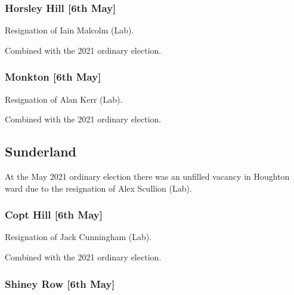 \documentclass[a4paper,openany]{book}
\begin{document}
\begin{resultsiii}
\subsubsection*{Horsley Hill \hspace*{\fill}\nolinebreak[1]%
	\enspace\hspace*{\fill}
	[6th May]}


Resignation of Iain Malcolm (Lab).

Combined with the 2021 ordinary election.

\subsubsection*{Monkton \hspace*{\fill}\nolinebreak[1]%
	\enspace\hspace*{\fill}
	[6th May]}


Resignation of Alan Kerr (Lab).

Combined with the 2021 ordinary election.

\subsection*{Sunderland}

At the May 2021 ordinary election there was an unfilled vacancy in Houghton ward due to the resignation of Alex Scullion (Lab).

\subsubsection*{Copt Hill \hspace*{\fill}\nolinebreak[1]%
	\enspace\hspace*{\fill}
	[6th May]}


Resignation of Jack Cunningham (Lab).

Combined with the 2021 ordinary election.

\subsubsection*{Shiney Row \hspace*{\fill}\nolinebreak[1]%
	\enspace\hspace*{\fill}
	[6th May]}


\end{resultsiii}
\end{document}
